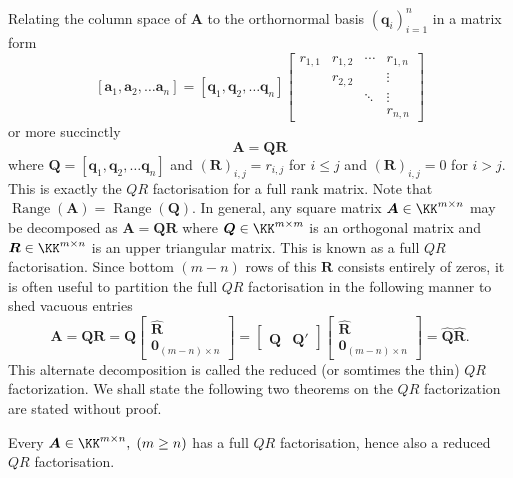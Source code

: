 Relating the column space of $\bm{A}$ to the orthornormal basis $\left( \bm{q}_{i} \right)_{i=1}^{n}$ in a matrix form
\[
    \left[ \bm{a}_1 , \bm{a}_2 , \ldots \bm{a}_n \right] =
    \left[ \bm{q}_1 , \bm{q}_2 , \ldots \bm{q}_n \right]
    \begin{bmatrix}
        r_{1,1} & r_{1,2} & \cdots & r_{1,n} \\
                & r_{2,2} &        & \vdots  \\
                &         & \ddots & \vdots  \\
                &         &        & r_{n,n}
    \end{bmatrix}
\]
or more succinctly
\begin{equation}\label{eq: QR_factorisation}
    \bm{A} = \bm{Q} \bm{R}
\end{equation}
where $\bm{Q} = \left[ \bm{q}_1 , \bm{q}_2 , \ldots \bm{q}_n \right]$ and $\left( \bm{R} \right)_{i,j} = r_{i,j}$ for $i \leq j$ and $\left( \bm{R} \right)_{i,j} = 0$ for $i > j$. This is exactly the $QR$ factorisation for a full rank matrix. Note that $\operatorname{Range} \left( \bm{A} \right) = \operatorname{Range} \left( \bm{Q} \right)$. In general, any square matrix  $\bm{A} \in \KK^{m \times n}$ may be decomposed as $\bm{A} = \bm{Q} \bm{R}$ where $\bm{Q} \in \KK^{m \times m}$ is an orthogonal matrix and $\bm{R} \in \KK^{m \times n}$ is an upper triangular matrix. This is known as a full $QR$ factorisation. Since bottom $(m-n)$ rows of this $\bm{R}$ consists entirely of zeros, it is often useful to partition the full $QR$ factorisation in the following manner to shed vacuous entries
\[
    \bm{A} = \bm{Q} \bm{R} = \bm{Q}
    \begin{bmatrix}
        \hat{\bm{R}} \\
        \bm{0}_{(m-n) \times n}
    \end{bmatrix}
    =
    \begin{bmatrix}
        \hat{\bm{Q}} & \bm{Q}'
    \end{bmatrix}
    \begin{bmatrix}
        \hat{\bm{R}} \\
        \bm{0}_{(m-n) \times n}
    \end{bmatrix}
    = \hat{\bm{Q}} \hat{\bm{R}}.
\]
This alternate decomposition is called the reduced (or somtimes the thin) $QR$ factorization. We shall state the following two theorems on the $QR$ factorization are stated without proof.

\begin{thm} \label{theorem: QR_general_existence}
    Every $\bm{A} \in \KK^{m \times n}, \; (m \geq n)$ has a full $QR$ factorisation, hence also a reduced $QR$ factorisation.
    \cite{TrefethenLloydN.LloydNicholas1997Nla/}
\end{thm}

